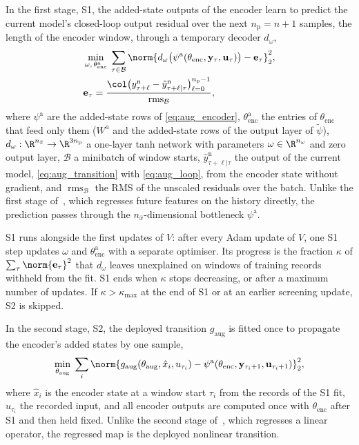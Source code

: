 In the first stage, S1, the added-state outputs of the encoder learn to
predict the current model's closed-loop output residual over the next
$n_{\mathrm p}=n+1$ samples, the length of the encoder window, through a
temporary decoder $d_\omega$,
\begin{equation}
\begin{aligned}
 &\min_{\omega,\,\theta^{\mathrm a}_{\mathrm{enc}}}\;
 \sum_{\tau\in\mathcal B}
 \norm{d_\omega\bigl(\psi^{\mathrm a}(\theta_{\mathrm{enc}},\mathbf y_\tau,\mathbf u_\tau)\bigr)
 -\mathbf e_\tau}_2^2,\\
 &\mathbf e_\tau=\frac{\col\bigl(y^{\mathrm n}_{\tau+\ell}-\hat y^{\mathrm n}_{\tau+\ell|\tau}\bigr)_{\ell=0}^{n_{\mathrm p}-1}}
 {\operatorname{rms}_{\mathcal B}},
\end{aligned}
\label{eq:ps2_s1}
\end{equation}
where $\psi^{\mathrm a}$ are the added-state rows of \eqref{eq:aug_encoder},
$\theta^{\mathrm a}_{\mathrm{enc}}$ the entries of $\theta_{\mathrm{enc}}$
that feed only them ($W^a$ and the added-state rows of the output layer of
$\tilde\psi$), $d_\omega:\R^{n_{\bar x}}\to\R^{3n_{\mathrm p}}$ a one-layer
tanh network with parameters $\omega\in\R^{n_\omega}$ and zero output layer,
$\mathcal B$ a minibatch of window starts, $\hat y^{\mathrm n}_{\tau+\ell|\tau}$
the output of the current model, \eqref{eq:aug_transition} with
\eqref{eq:aug_loop}, from the encoder state without gradient, and
$\operatorname{rms}_{\mathcal B}$ the RMS of the unscaled residuals over the
batch.
Unlike the first stage of~\cite[Sec.~3]{hefny2015supervised}, which regresses
future features on the history directly, the prediction passes through the
$n_{\bar x}$-dimensional bottleneck $\psi^{\mathrm a}$.

S1 runs alongside the first updates of $V$: after every Adam update of $V$,
one S1 step updates $\omega$ and $\theta^{\mathrm a}_{\mathrm{enc}}$ with a
separate optimiser.
Its progress is the fraction $\kappa$ of $\sum_\tau\norm{\mathbf e_\tau}^2$
that $d_\omega$ leaves unexplained on windows of training records withheld
from the fit.
S1 ends when $\kappa$ stops decreasing, or after a maximum number of updates.
If $\kappa>\kappa_{\max}$ at the end of S1 or at an earlier screening update,
S2 is skipped.

In the second stage, S2, the deployed transition $g_{\mathrm{aug}}$ is fitted
once to propagate the encoder's added states by one sample,
\begin{equation}
 \min_{\theta_{\mathrm{aug}}}\;\sum_{i}
 \norm{g_{\mathrm{aug}}(\theta_{\mathrm{aug}},\hat x_i,u_{\tau_i})
 -\psi^{\mathrm a}(\theta_{\mathrm{enc}},\mathbf y_{\tau_i+1},\mathbf u_{\tau_i+1})}_2^2,
 \label{eq:ps2_s2}
\end{equation}
where $\hat x_i$ is the encoder state at a window start $\tau_i$ from the
records of the S1 fit, $u_{\tau_i}$ the recorded input, and all encoder outputs are computed once with
$\theta_{\mathrm{enc}}$ after S1 and then held fixed.
Unlike the second stage of~\cite[Sec.~3]{hefny2015supervised}, which regresses
a linear operator, the regressed map is the deployed nonlinear transition.

